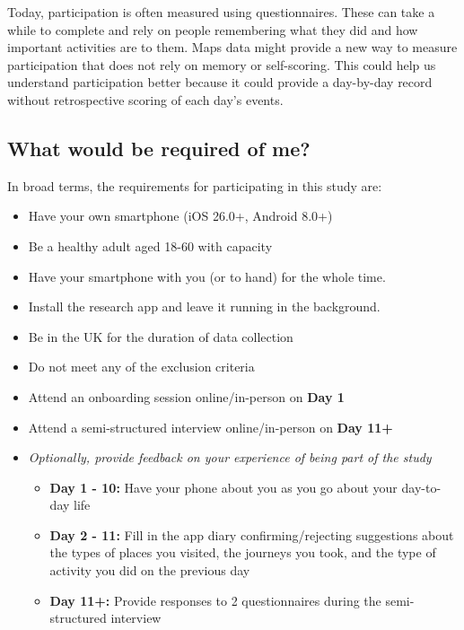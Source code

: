 Today, participation is often measured using questionnaires. These can take a while to complete and rely on people remembering what they did and how important activities are to them. Maps data might provide a new way to measure participation that does not rely on memory or self-scoring. This could help us understand participation better because it could provide a day-by-day record without retrospective scoring of each day's events.

\subsection*{What would be required of me?}
In broad terms, the requirements for participating in this study are:
\begin{itemize}
    \item Have your own smartphone (iOS 26.0+, Android 8.0+)
    \item Be a healthy adult aged 18-60 with capacity
    \item Have your smartphone with you (or to hand) for the whole time.
    \item Install the research app and leave it running in the background.
    \item Be in the UK for the duration of data collection
    \item Do not meet any of the exclusion criteria %
    \item{Attend an onboarding session online/in-person on \textbf{Day 1}}
    \item{Attend a semi-structured interview online/in-person on \textbf{Day 11+}}
    \item{\textit{Optionally, provide feedback on your experience of being part of the study}}
    \begin{itemize}
        \item{\textbf{Day 1 - 10:} Have your phone about you as you go about your day-to-day life}
        \item{\textbf{Day 2 - 11:} Fill in the app diary confirming/rejecting suggestions about the types of places you visited, the journeys you took, and the type of activity you did on the previous day}
        \item{\textbf{Day 11+:} Provide responses to 2 questionnaires during the semi-structured interview}
    \end{itemize}

\end{itemize}

